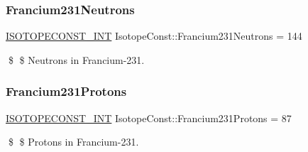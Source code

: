 \subsubsection{\texorpdfstring{Francium231\+Neutrons}{Francium231Neutrons}}
{\footnotesize\ttfamily \mbox{\hyperlink{group___isotope_const-_macros_ga5f18360b3e99483a35c32d789e62621c}{I\+S\+O\+T\+O\+P\+E\+C\+O\+N\+S\+T\+\_\+\+I\+NT}} Isotope\+Const\+::\+Francium231\+Neutrons = 144}

\$ \$ Neutrons in Francium-\/231. \mbox{\label{group___isotope_const-_francium-_fr231_ga0cc63d0e035cc49743c78d02720019c0}} 
\subsubsection{\texorpdfstring{Francium231\+Protons}{Francium231Protons}}
{\footnotesize\ttfamily \mbox{\hyperlink{group___isotope_const-_macros_ga5f18360b3e99483a35c32d789e62621c}{I\+S\+O\+T\+O\+P\+E\+C\+O\+N\+S\+T\+\_\+\+I\+NT}} Isotope\+Const\+::\+Francium231\+Protons = 87}

\$ \$ Protons in Francium-\/231. 